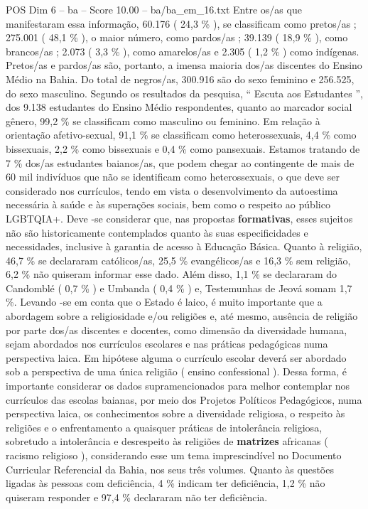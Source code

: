 \begin{textsample}{POS Dim 6 – ba – Score 10.00 – ba/ba\_em\_16.txt}
Entre os/as que manifestaram essa informação, 60.176 ( 24,3 \% ), se classificam como pretos/as ; 275.001 ( 48,1 \% ), o maior número, como pardos/as ; 39.139 ( 18,9 \% ), como brancos/as ; 2.073 ( 3,3 \% ), como amarelos/as e 2.305 ( 1,2 \% ) como indígenas.
Pretos/as e pardos/as são, portanto, a imensa maioria dos/as discentes do Ensino Médio na Bahia.
Do total de negros/as, 300.916 são do sexo feminino e 256.525, do sexo masculino.
Segundo os resultados da pesquisa, “ Escuta aos Estudantes ”, dos 9.138 estudantes do Ensino Médio respondentes, quanto ao marcador social gênero, 99,2 \% se classificam como masculino ou feminino.
Em relação à orientação afetivo-sexual, 91,1 \% se classificam como heterossexuais, 4,4 \% como bissexuais, 2,2 \% como bissexuais e 0,4 \% como pansexuais.
Estamos tratando de 7 \% dos/as estudantes baianos/as, que podem chegar ao contingente de mais de 60 mil indivíduos que não se identificam como heterossexuais, o que deve ser considerado nos currículos, tendo em vista o desenvolvimento da autoestima necessária à saúde e às superações sociais, bem como o respeito ao público LGBTQIA+.
Deve -se considerar que, nas propostas \textbf{formativas}, esses sujeitos não são historicamente contemplados quanto às suas especificidades e necessidades, inclusive à garantia de acesso à Educação Básica.
Quanto à religião, 46,7 \% se declararam católicos/as, 25,5 \% evangélicos/as e 16,3 \% sem religião, 6,2 \% não quiseram informar esse dado.
Além disso, 1,1 \% se declararam do Candomblé ( 0,7 \% ) e Umbanda ( 0,4 \% ) e, Testemunhas de Jeová somam 1,7 \%.
Levando -se em conta que o Estado é laico, é muito importante que a abordagem sobre a religiosidade e/ou religiões e, até mesmo, ausência de religião por parte dos/as discentes e docentes, como dimensão da diversidade humana, sejam abordados nos currículos escolares e nas práticas pedagógicas numa perspectiva laica.
Em hipótese alguma o currículo escolar deverá ser abordado sob a perspectiva de uma única religião ( ensino confessional ).
Dessa forma, é importante considerar os dados supramencionados para melhor contemplar nos currículos das escolas baianas, por meio dos Projetos Políticos Pedagógicos, numa perspectiva laica, os conhecimentos sobre a diversidade religiosa, o respeito às religiões e o enfrentamento a quaisquer práticas de intolerância religiosa, sobretudo a intolerância e desrespeito às religiões de \textbf{matrizes} africanas ( racismo religioso ), considerando esse um tema imprescindível no Documento Curricular Referencial da Bahia, nos seus três volumes.
Quanto às questões ligadas às pessoas com deficiência, 4 \% indicam ter deficiência, 1,2 \% não quiseram responder e 97,4 \% declararam não ter deficiência.

\end{textsample}
